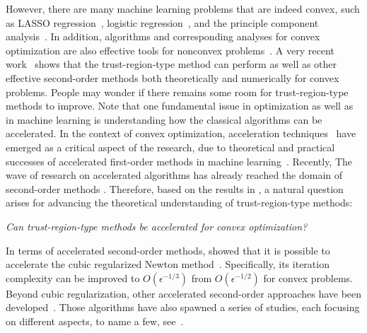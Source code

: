 \documentclass{article}
\begin{document}
However, there are many machine learning problems that are indeed convex, such as LASSO regression~\cite{ranstam2018lasso}, logistic regression~\citet{lavalley2008logistic}, and the principle component analysis~\cite{abdi2010principal}. In addition, algorithms and corresponding analyses for convex optimization are also effective tools for nonconvex problems~\cite{carmon2017convex,carmon2018accelerated,li2023restarted}. A very recent work~\cite{jiang2024nonconvexityuniversaltrustregionmethod} shows that the trust-region-type method can perform as well as other effective second-order methods both theoretically and numerically for convex problems. People may wonder if there remains some room for trust-region-type methods to improve.
Note that one fundamental issue in optimization as well as in machine learning is understanding how the classical algorithms can be accelerated. In the context of convex optimization, acceleration techniques~\cite{nesterovMethodSolvingConvex1983a,nesterov_lectures_2018} have emerged as a critical aspect of the research, due to theoretical and practical successes of accelerated first-order methods in machine learning~\cite{lan_first-order_2020,lin2020accelerated}. Recently, The wave of research on accelerated algorithms has already reached the domain of second-order methods \cite{nesterov2008accelerating, monteiro2013accelerated,doikov2020contracting,carmon2022optimal,NEURIPS2022_e56f394b}.
Therefore, based on the results in \citet{jiang2024nonconvexityuniversaltrustregionmethod}, a natural question arises for advancing the theoretical understanding of trust-region-type methods:
    \begin{center}
        \emph{Can trust-region-type methods be accelerated for convex optimization?}
    \end{center}
In terms of accelerated second-order methods, \citet{nesterov2008accelerating} showed that it is possible to accelerate the cubic regularized Newton method~\cite{nesterov2006cubic}. Specifically, its iteration complexity can be improved to $O(\epsilon^{-1/3})$ from $O(\epsilon^{-1/2})$ for convex problems. Beyond cubic regularization, other accelerated second-order approaches have been developed~\cite{monteiro2013accelerated,doikov2020contracting,carmon2022optimal,NEURIPS2022_e56f394b}. Those algorithms have also spawned a series of studies, each focusing on different aspects, to name a few, see~\citet{jiang2020unified,jiang2021optimal,chen2022accelerating,lin2022explicit,agafonov2023inexact,agafonov2024advancing,jiang2024accelerated,huang2024inexact}. 
\end{document}

